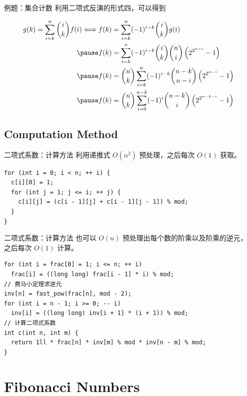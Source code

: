 \documentclass[12pt,aspectratio=169]{beamer}
\begin{document}
\begin{frame}[fragile]{例题：集合计数}
利用二项式反演的形式四，可以得到

$$
\begin{aligned}
g(k) = \sum_{i=k}^{n} {i \choose k} f(i) \Longleftrightarrow
f(k) &= \sum_{i=k}^{n} (-1)^{i-k} {i \choose k} g(i) \\ \pause
f(k) &= \sum_{i=k}^{n} (-1)^{i-k} {i \choose k} {n \choose i} \left(2^{2^{n-i}}-1\right) \\ \pause
f(k) &= {n \choose k} \sum_{i=k}^{n} (-1)^{i-k} {n - k \choose n - i} \left(2^{2^{n-i}}-1\right) \\ \pause
f(k) &= {n \choose k} \sum_{i=0}^{n-k} (-1)^{i} {n - k \choose i} \left(2^{2^{n-k-i}}-1\right) \\
\end{aligned}
$$
\end{frame}

\subsection[计算方法]{Computation Method}

\begin{frame}[fragile]{二项式系数：计算方法}
利用递推式 $O(n^2)$ 预处理，之后每次 $O(1)$ 获取。

\begin{verbatim}
for (int i = 0; i < n; ++ i) {
  c[i][0] = 1;
  for (int j = 1; j <= i; ++ j) {
    c[i][j] = (c[i - 1][j] + c[i - 1][j - 1]) % mod;
  }
}
\end{verbatim}
\end{frame}

\begin{frame}[fragile]{二项式系数：计算方法}
也可以 $O(n)$ 预处理出每个数的阶乘以及阶乘的逆元，之后每次 $O(1)$ 计算。

\begin{verbatim}
for (int i = frac[0] = 1; i <= n; ++ i)
  frac[i] = ((long long) frac[i - 1] * i) % mod;
// 费马小定理求逆元
inv[n] = fast_pow(frac[n], mod - 2);
for (int i = n - 1; i >= 0; -- i)
  inv[i] = ((long long) inv[i + 1] * (i + 1)) % mod;
// 计算二项式系数
int c(int n, int m) {
  return 1ll * frac[n] * inv[m] % mod * inv[n - m] % mod;
}
\end{verbatim}
\end{frame}

\section[斐波那契数]{Fibonacci Numbers}
\end{document}
